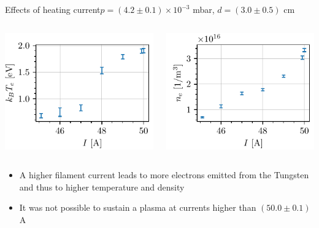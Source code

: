 \documentclass[10pt]{beamer}
\begin{document}
\begin{frame}{Effects of heating current}{$p = (4.2 \pm 0.1) \times 10^{-3}$ mbar, $d = (3.0 \pm 0.5)$ cm}
    \begin{columns}
        \centering
        \includegraphics[scale=1]{../figures/temperatureeV_current.pdf}


        \centering
        \includegraphics[scale=1]{../figures/density_current.pdf}

    \end{columns}
    \vspace{0.5cm}
    \begin{itemize}
        \item A higher filament current leads to more electrons emitted from the Tungsten and thus to higher temperature and density
        \item It was not possible to sustain a plasma at currents higher than $(50.0 \pm 0.1)$ A
    \end{itemize}
\end{frame}

\end{document}
